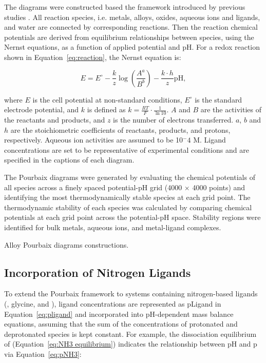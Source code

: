 The diagrams were constructed based the framework introduced by previous studies \cite{PourbaixAtlasSolutions, Huang2017ImprovedCompounds,Huang2015ElectrochemicalCalculations,Singh2017ElectrochemicalMaterials,Patel2019EfficientCompounds,Persson2012PredictionStates}. All reaction species, i.e. metals, alloys, oxides, aqueous ions and ligands, and water are connected by corresponding reactions. Then the reaction chemical potentials are derived from equilibrium relationships between species, using the Nernst equations, as a function of applied potential and pH. For a redox reaction shown in Equation~\eqref{eq:reaction}, the Nernst equation is:

\begin{equation} \label{eq:nernst} E = E^\circ - \frac{k}{z} \log \left(\frac{A^a}{B^b}\right) - \frac{k \cdot h}{z} \text{pH}, \end{equation}

where \(E\) is the cell potential at non-standard conditions, \(E^\circ\) is the standard electrode potential, and $k$ is defined as \(k = \frac{RT}{F} \cdot \frac{1}{\ln 10}\). \(A\) and \(B\) are the activities of the reactants and products, and \(z\) is the number of electrons transferred. \(a\), \(b\) and \(h\) are the stoichiometric coefficients of reactants, products, and protons, respectively. Aqueous ion activities are assumed to be 10$^-4$ M. Ligand concentrations are set to be representative of experimental conditions and are specified in the captions of each diagram. 

The Pourbaix diagrams were generated by evaluating the chemical potentials of all species across a finely spaced potential-pH grid (4000 $\times$ 4000 points) and identifying the most thermodynamically stable species at each grid point. The thermodynamic stability of each species was calculated by comparing chemical potentials at each grid point across the potential-pH space. Stability regions were identified for bulk metals, aqueous ions, and metal-ligand complexes. 

Alloy Pourbaix diagrams constructions. 


\subsection{Incorporation of Nitrogen Ligands}
To extend the Pourbaix framework to systems containing nitrogen-based ligands (, glycine, and ), ligand concentrations are represented as pLigand in Equation~\eqref{eq:pligand} and incorporated into pH-dependent mass balance equations, assuming that the sum of the concentrations of protonated and deprotonated species is kept constant. For example, the dissociation equilibrium of  (Equation~\eqref{eq:NH3 equilibrium}) indicates the relationship between pH and p via Equation~\eqref{eq:pNH3}:

